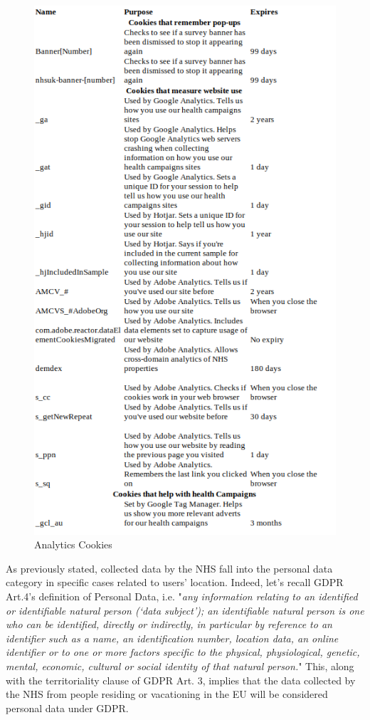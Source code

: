 \documentclass[twocolumn, letterpaper,13pt]{scrartcl}
\begin{document}
	    \begin{figure}	\includegraphics[width=0.98\linewidth]{analytics_cookies.png}
        \caption{Analytics Cookies\label{fig:c}}
        \end{figure}
	    
	    As previously stated, collected data by the NHS fall into the personal data category in specific cases related to users' location. Indeed, let's recall GDPR Art.4's definition of Personal Data, i.e. "\textit{any information relating to an identified or identifiable natural person (‘data subject’); an identifiable natural person is one who can be identified, directly or indirectly, in particular by reference to an identifier such as a name, an identification number, location data, an online identifier or to one or more factors specific to the physical, physiological, genetic, mental, economic, cultural or social identity of that natural person.}" This, along with the territoriality clause of GDPR Art. 3, implies that the data collected by the NHS from people residing or vacationing in the EU will be considered personal data under GDPR.
	    
\end{document}
